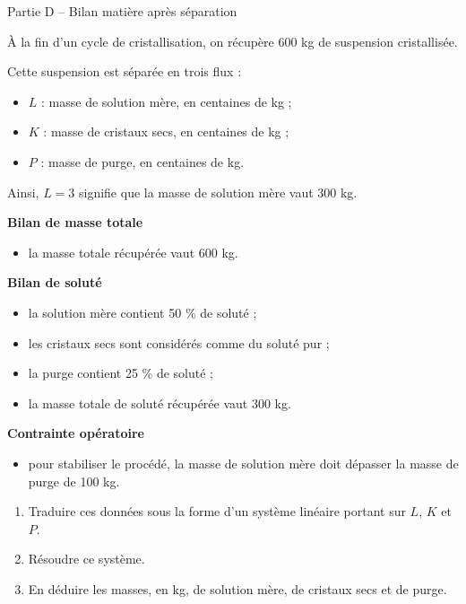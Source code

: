 \documentclass[10pt,a4paper]{article}
\begin{document}
	\begin{partbox}{Partie D -- Bilan matière après séparation}
		
		À la fin d'un cycle de cristallisation, on récupère 600 kg de suspension cristallisée.
		
		Cette suspension est séparée en trois flux :
		\begin{itemize}
			\item $L$ : masse de solution mère, en centaines de kg ;
			\item $K$ : masse de cristaux secs, en centaines de kg ;
			\item $P$ : masse de purge, en centaines de kg.
		\end{itemize}
		
		Ainsi, $L=3$ signifie que la masse de solution mère vaut 300 kg.
		
		\begin{databox}
			\textbf{Bilan de masse totale}
			\begin{itemize}
				\item la masse totale récupérée vaut 600 kg.
			\end{itemize}
			
			\textbf{Bilan de soluté}
			\begin{itemize}
				\item la solution mère contient 50 \% de soluté ;
				\item les cristaux secs sont considérés comme du soluté pur ;
				\item la purge contient 25 \% de soluté ;
				\item la masse totale de soluté récupérée vaut 300 kg.
			\end{itemize}
			
			\textbf{Contrainte opératoire}
			\begin{itemize}
				\item pour stabiliser le procédé, la masse de solution mère doit dépasser la masse de purge de 100 kg.
			\end{itemize}
		\end{databox}
		
		\begin{enumerate}
			\item Traduire ces données sous la forme d'un système linéaire portant sur $L$, $K$ et $P$.
			
			\item Résoudre ce système.
			
			\item En déduire les masses, en kg, de solution mère, de cristaux secs et de purge.
		\end{enumerate}
		
	\end{partbox}
	
\end{document}
